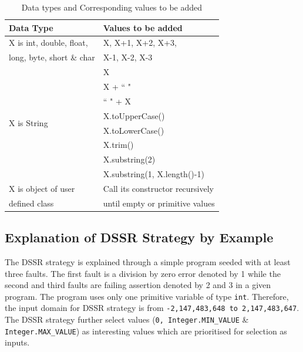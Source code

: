 \bigskip
\bigskip
\bigskip
\begin{table}[ht]
\caption{Data types and Corresponding values to be added} %
\bigskip
\centering %
{\renewcommand{\arraystretch}{1.5} 
\begin{tabular}{| l | l |} %
\hline\hline %
Data Type & Values to be added\\ [0.5ex] %
\hline %
\multirow{1}{*}{X is int, double, float, } & X,  X+1, X+2, X+3,  \\ %
\multirow{1}{*}{long, byte, short \& char} & X-1, X-2, X-3 \\ 

\hline
\multirow{8}{*}{X is String} & X\\ %

& X + ``  "\\ %
& ``  " + X \\ %
& X.toUpperCase() \\
& X.toLowerCase() \\
& X.trim() \\
& X.substring(2) \\
& X.substring(1, X.length()-1) \\
\hline
\multirow{1}{*}{X is object of user} & Call its constructor recursively \\ %
\multirow{1}{*}{defined class} & until empty or primitive values \\[1ex]
\hline
\hline %
\end{tabular}
}
\bigskip
\label{table:addvalues2} %
\end{table}
\bigskip




\subsection{Explanation of DSSR Strategy by Example}
The DSSR strategy is explained through a simple program seeded with at least three faults. The first fault is a division by zero error denoted by 1 while the second and third faults are failing assertion denoted by 2 and 3 in a given program. The program uses only one primitive variable of type \verb+int+. Therefore, the input domain for DSSR strategy is from \verb+-2,147,483,648 to 2,147,483,647+. The DSSR strategy further select values (\verb+0, Integer.MIN_VALUE+ \& \verb+Integer.MAX_VALUE+) as interesting values which are prioritised for selection as inputs. 

